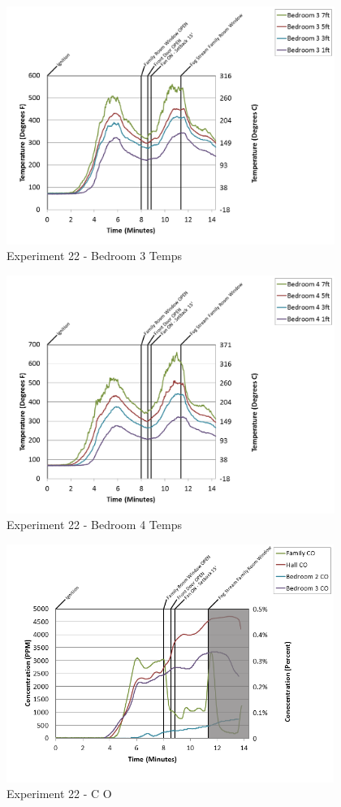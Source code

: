 \documentclass{article}
\begin{document}
\begin{appendices}
\clearpage

\begin{figure}[h!]
	\centering
	\includegraphics[height=3.05in]{0_Images/Results_Charts/Exp_22_Charts/Bedroom3Temps.png}
	\caption{Experiment 22 - Bedroom 3 Temps}
\end{figure}


\begin{figure}[h!]
	\centering
	\includegraphics[height=3.05in]{0_Images/Results_Charts/Exp_22_Charts/Bedroom4Temps.png}
	\caption{Experiment 22 - Bedroom 4 Temps}
\end{figure}

\clearpage

\begin{figure}[h!]
	\centering
	\includegraphics[height=3.05in]{0_Images/Results_Charts/Exp_22_Charts/CO.png}
	\caption{Experiment 22 - C O}
\end{figure}



\end{appendices}
\end{document}

